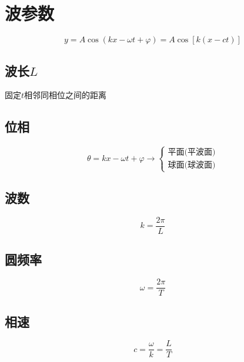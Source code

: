 \documentclass[a4paper,oneside]{ctexbook}
\begin{document}
\section{波参数}
\begin{equation}
    y=A\cos(kx-\omega{t}+\varphi)=A\cos{}[k(x-ct)]
\end{equation}

\subsection{波长\(L\)}

固定\(t\)相邻同相位之间的距离
\begin{figure}[htbp]
    \centering
\end{figure}

\subsection{位相}
\begin{equation}
    \theta=kx-\omega{t}+\varphi
    \rightarrow
    \left\{
    \begin{array}{c}
    \text{平面(平波面)}\\
    \text{球面(球波面)}
    \end{array}
    \right.
\end{equation}

\subsection{波数}
\begin{equation}
    k=\dfrac{2\pi}{L}
\end{equation}

\subsection{圆频率}
\begin{equation}
    \omega=\dfrac{2\pi}{T}
\end{equation}

\subsection{相速}
\begin{equation}
    c=\dfrac{\omega}{k}=\dfrac{L}{T}
\end{equation}
\end{document}
